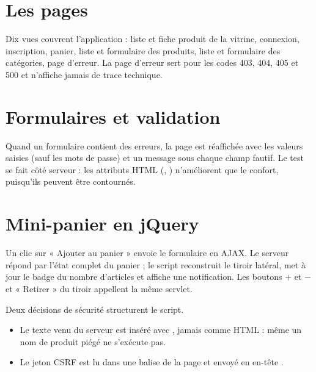 \section{Les pages}
Dix vues couvrent l'application : liste et fiche produit de la vitrine, connexion, inscription, panier, liste et formulaire
des produits, liste et formulaire des catégories, page d'erreur. La page d'erreur sert pour les codes 403, 404, 405 et 500 et
n'affiche jamais de trace technique.


\section{Formulaires et validation}
Quand un formulaire contient des erreurs, la page est réaffichée avec les valeurs saisies (sauf les mots de passe) et un
message sous chaque champ fautif. Le test se fait côté serveur : les attributs HTML (, )
n'améliorent que le confort, puisqu'ils peuvent être contournés.


\section{Mini-panier en jQuery}
Un clic sur « Ajouter au panier » envoie le formulaire en AJAX. Le serveur répond par l'état complet du panier ; le script
reconstruit le tiroir latéral, met à jour le badge du nombre d'articles et affiche une notification. Les boutons $+$ et $-$
et « Retirer » du tiroir appellent la même servlet.

Deux décisions de sécurité structurent le script.
\begin{itemize}
  \item Le texte venu du serveur est inséré avec , jamais comme HTML : même un nom de produit piégé ne s'exécute pas.
  \item Le jeton CSRF est lu dans une balise  de la page et envoyé en en-tête .
\end{itemize}


